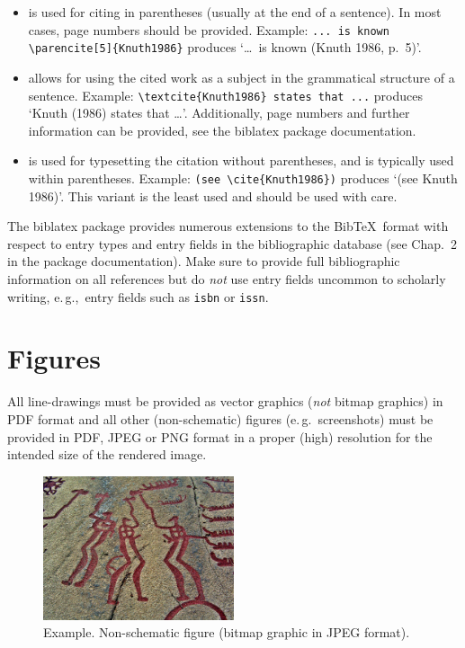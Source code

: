 \documentclass[a4paper]{ltxdoc}
\providecommand*\pkg[1]{\textsf{#1}}
\begin{document}
\begin{itemize}
\item {} is used for citing in parentheses (usually at the end of a sentence). In most cases, page numbers should be provided. Example: \verb|... is known \parencite[5]{Knuth1986}| produces ‘\ldots\ is known (Knuth 1986, p.~5)’.

\item {} allows for using the cited work as a subject in the grammatical structure of a sentence. Example: \verb|\textcite{Knuth1986} states that ...| produces ‘Knuth (1986) states that \ldots’. Additionally, page numbers and further information can be provided, see the \pkg{biblatex} package documentation.

\item {} is used for typesetting the citation without parentheses, and is typically used within parentheses. Example: \verb|(see \cite{Knuth1986})| produces ‘(see Knuth 1986)’. This variant is the least used and should be used with care.
\end{itemize}

The \pkg{biblatex} package provides numerous extensions to the Bib\TeX\ format with respect to entry types and entry fields in the bibliographic database (see Chap.~2 in the package documentation). Make sure to provide full bibliographic information on all references but do \emph{not} use entry fields uncommon to scholarly writing, e.\,g.,\ entry fields such as \verb|isbn| or \verb|issn|.






\section{Figures}
All line-drawings must be provided as vector graphics (\emph{not} bitmap graphics) in PDF format and all other (non-schematic) figures (e.\,g.\ screenshots) must be provided in PDF, JPEG or PNG format in a proper (high) resolution for the intended size of the rendered image.

 
\begin{figure}[htbp]
\begin{center}
\includegraphics[width=0.5\textwidth]{bitmap}
\caption{Example. Non-schematic figure (bitmap graphic in JPEG format).}
\label{default}
\end{center}
\end{figure}
\end{document}
